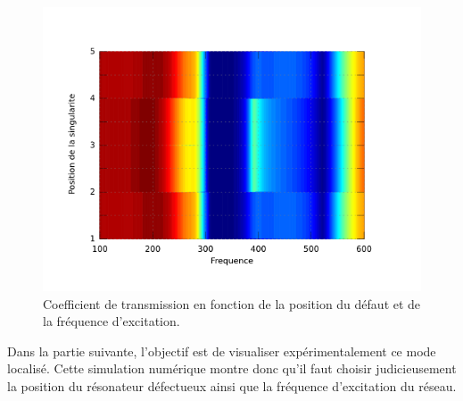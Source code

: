 \begin{figure}
	\centering
	\includegraphics[scale=0.5]{images_chp2/pos_singu.png}
	\caption{Coefficient de transmission en fonction de la position du défaut et de la fréquence d'excitation.\label{pos_singu}}
\end{figure}

Dans la partie suivante, l'objectif est de visualiser expérimentalement ce mode localisé. Cette simulation numérique montre donc qu'il faut choisir judicieusement la position du résonateur défectueux ainsi que la fréquence d'excitation du réseau.